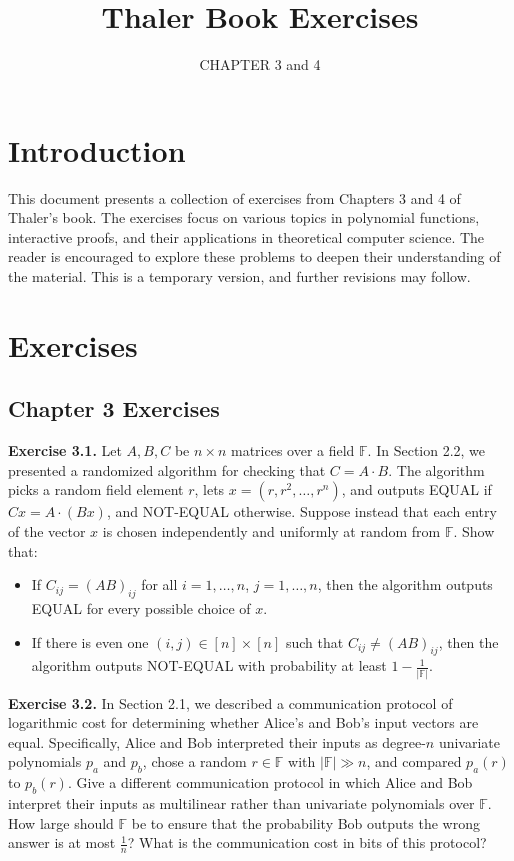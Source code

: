 \documentclass{article}
\author{CHAPTER 3 and 4}
\title{Thaler Book Exercises}
\date{}
\begin{document}
\maketitle

\section{Introduction}
This document presents a collection of exercises from Chapters 3 and 4 of Thaler's book. The exercises focus on various topics in polynomial functions, interactive proofs, and their applications in theoretical computer science. The reader is encouraged to explore these problems to deepen their understanding of the material. This is a temporary version, and further revisions may follow.

\section{Exercises}

\subsection{Chapter 3 Exercises}

\textbf{Exercise 3.1.} Let $A, B, C$ be $n \times n$ matrices over a field $\mathbb{F}$. In Section 2.2, we presented a randomized algorithm for checking that $C = A \cdot B$. The algorithm picks a random field element $r$, lets $x = (r, r^2, \ldots, r^n)$, and outputs EQUAL if $C x = A \cdot (B x)$, and NOT-EQUAL otherwise. Suppose instead that each entry of the vector $x$ is chosen independently and uniformly at random from $\mathbb{F}$. Show that:
\begin{itemize}
    \item If $C_{ij} = (A B)_{ij}$ for all $i=1, \ldots, n$, $j=1, \ldots, n$, then the algorithm outputs EQUAL for every possible choice of $x$.
    \item If there is even one $(i, j) \in [n] \times [n]$ such that $C_{ij} \neq (A B)_{ij}$, then the algorithm outputs NOT-EQUAL with probability at least $1 - \frac{1}{|\mathbb{F}|}$.
\end{itemize}

\textbf{Exercise 3.2.} In Section 2.1, we described a communication protocol of logarithmic cost for determining whether Alice's and Bob's input vectors are equal. Specifically, Alice and Bob interpreted their inputs as degree-$n$ univariate polynomials $p_a$ and $p_b$, chose a random $r \in \mathbb{F}$ with $|\mathbb{F}| \gg n$, and compared $p_a(r)$ to $p_b(r)$. Give a different communication protocol in which Alice and Bob interpret their inputs as multilinear rather than univariate polynomials over $\mathbb{F}$. How large should $\mathbb{F}$ be to ensure that the probability Bob outputs the wrong answer is at most $\frac{1}{n}$? What is the communication cost in bits of this protocol?
\end{document}
